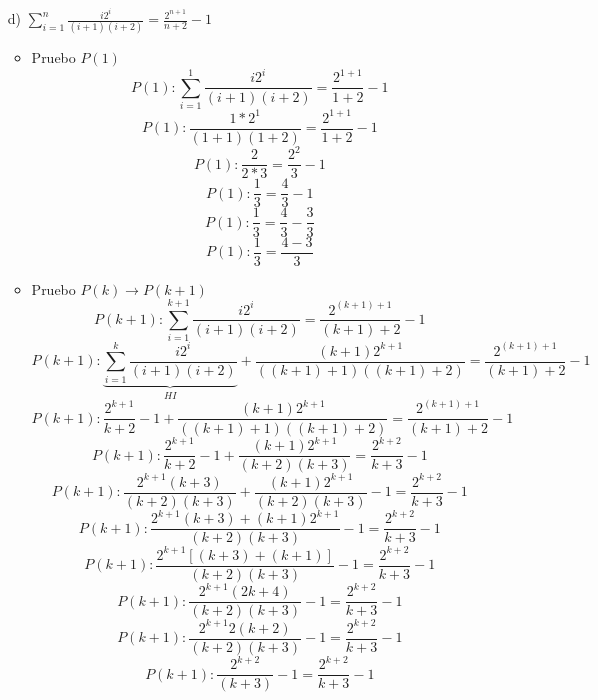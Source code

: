 \documentclass[10pt,a4paper]{article}
\begin{document}
\begin{enumerate}
\item[d)]$\sum^{n}_{i=1}\frac{i2^{i}}{(i+1)(i+2)}=\frac{2^{n+1}}{n+2}-1$
	\begin{itemize}
	\item Pruebo $P(1)$
	$$P(1):\sum^{1}_{i=1}\frac{i2^{i}}{(i+1)(i+2)}=\frac{2^{1+1}}{1+2}-1$$
	$$P(1):\frac{1*2^{1}}{(1+1)(1+2)}=\frac{2^{1+1}}{1+2}-1$$
	$$P(1):\frac{2}{2*3}=\frac{2^{2}}{3}-1$$
	$$P(1):\frac{1}{3}=\frac{4}{3}-1$$
	$$P(1):\frac{1}{3}=\frac{4}{3}-\frac{3}{3}$$
	$$P(1):\frac{1}{3}=\frac{4-3}{3}$$
	
	\item Pruebo $P(k)\rightarrow P(k+1)$
	$$P(k+1):\sum^{k+1}_{i=1}\frac{i2^{i}}{(i+1)(i+2)}=\frac{2^{(k+1)+1}}{(k+1)+2}-1$$
	$$P(k+1):\underbrace{\sum^{k}_{i=1}\frac{i2^{i}}{(i+1)(i+2)}}_{HI} + \frac{(k+1)2^{k+1}}{((k+1)+1)((k+1)+2)}   =\frac{2^{(k+1)+1}}{(k+1)+2}-1$$
	$$P(k+1):  \frac{2^{k+1}}{k+2}-1    + \frac{(k+1)2^{k+1}}{((k+1)+1)((k+1)+2)}   =\frac{2^{(k+1)+1}}{(k+1)+2}-1$$
	$$P(k+1):  \frac{2^{k+1}}{k+2}-1    + \frac{(k+1)2^{k+1}}{(k+2)(k+3)}   =\frac{2^{k+2}}{k+3}-1$$
	$$P(k+1):  \frac{2^{k+1}(k+3)}{(k+2)(k+3)}    + \frac{(k+1)2^{k+1}}{(k+2)(k+3)} -1  =\frac{2^{k+2}}{k+3}-1$$
	$$P(k+1):  \frac{2^{k+1}(k+3)+(k+1)2^{k+1}}{(k+2)(k+3)}  -1  =\frac{2^{k+2}}{k+3}-1$$
	$$P(k+1):  \frac{2^{k+1}[(k+3)+(k+1)]}{(k+2)(k+3)}  -1  =\frac{2^{k+2}}{k+3}-1$$
	$$P(k+1):  \frac{2^{k+1}(2k+4)}{(k+2)(k+3)}  -1  =\frac{2^{k+2}}{k+3}-1$$
	$$P(k+1):  \frac{2^{k+1}2(k+2)}{(k+2)(k+3)}  -1  =\frac{2^{k+2}}{k+3}-1$$
	$$P(k+1):  \frac{2^{k+2}}{(k+3)}  -1  =\frac{2^{k+2}}{k+3}-1$$
	\end{itemize}
\end{enumerate}
\end{document}
